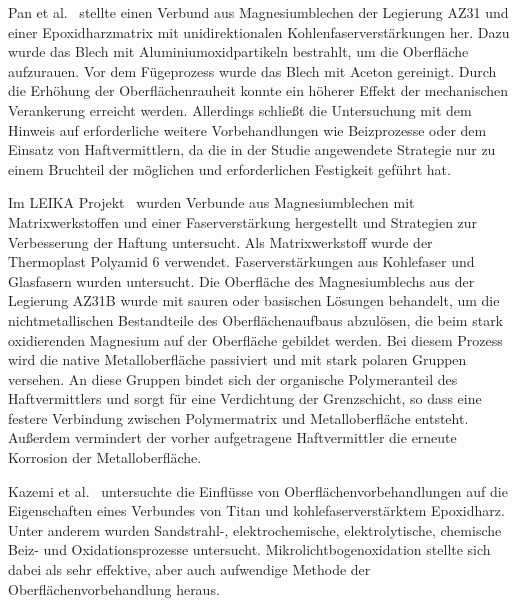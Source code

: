 Pan et al.~\cite{Pan.2016} stellte einen Verbund aus Magnesiumblechen der Legierung AZ31 und einer Epoxidharzmatrix mit unidirektionalen Kohlenfaserverstärkungen her.
Dazu wurde das Blech mit Aluminiumoxidpartikeln bestrahlt, um die Oberfläche aufzurauen.
Vor dem Fügeprozess wurde das Blech mit Aceton gereinigt.
Durch die Erhöhung der Oberflächenrauheit konnte ein höherer Effekt der mechanischen Verankerung erreicht werden.
Allerdings schließt die Untersuchung mit dem Hinweis auf erforderliche weitere Vorbehandlungen wie Beizprozesse oder dem Einsatz von Haftvermittlern, da die in der Studie angewendete Strategie nur zu einem Bruchteil der möglichen und erforderlichen Festigkeit geführt hat.

Im LEIKA Projekt~\cite{LEIKA.2017} wurden Verbunde aus Magnesiumblechen mit Matrixwerkstoffen und einer Faserverstärkung hergestellt und Strategien zur Verbesserung der Haftung untersucht.
Als Matrixwerkstoff wurde der Thermoplast Polyamid 6 verwendet.
Faserverstärkungen aus Kohlefaser und Glasfasern wurden untersucht.
Die Oberfläche des Magnesiumblechs aus der Legierung AZ31B wurde mit sauren oder basischen Lösungen behandelt, um die nichtmetallischen Bestandteile des Oberflächenaufbaus abzulösen, die beim stark oxidierenden Magnesium auf der Oberfläche gebildet werden.
Bei diesem Prozess wird die native Metalloberfläche passiviert und mit stark polaren Gruppen versehen.
An diese Gruppen bindet sich der organische Polymeranteil des Haftvermittlers und sorgt für eine Verdichtung der Grenzschicht, so dass eine festere Verbindung zwischen Polymermatrix und Metalloberfläche entsteht.
Außerdem vermindert der vorher aufgetragene Haftvermittler die erneute Korrosion der Metalloberfläche.

Kazemi et al.~\cite{Kazemi.2020} untersuchte die Einflüsse von Oberflächenvorbehandlungen auf die Eigenschaften eines Verbundes von Titan und kohlefaserverstärktem Epoxidharz.
Unter anderem wurden Sandstrahl-, elektrochemische, elektrolytische, chemische Beiz- und Oxidationsprozesse untersucht.
Mikrolichtbogenoxidation stellte sich dabei als sehr effektive, aber auch aufwendige Methode der Oberflächenvorbehandlung heraus.


